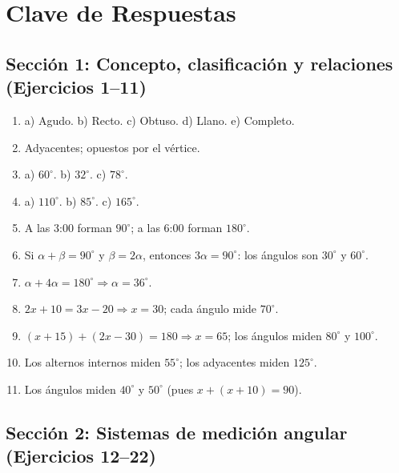 \documentclass[12pt, letterpaper]{article}
\begin{document}
  \section{Clave de Respuestas}

  \subsection*{Sección 1: Concepto, clasificación y relaciones (Ejercicios 1--11)}

  \begin{enumerate}[leftmargin=*, label=\textbf{\arabic*.}]
    \setcounter{enumi}{0}
    \item a) Agudo. \quad b) Recto. \quad c) Obtuso. \quad d) Llano. \quad e) Completo.
    \item Adyacentes; opuestos por el vértice.
    \item a) $60^{\circ}$. \quad b) $32^{\circ}$. \quad c) $78^{\circ}$.
    \item a) $110^{\circ}$. \quad b) $85^{\circ}$. \quad c) $165^{\circ}$.
    \item A las 3:00 forman $90^{\circ}$; a las 6:00 forman $180^{\circ}$.
    \item Si $\alpha + \beta = 90^{\circ}$ y $\beta = 2\alpha$, entonces $3\alpha = 90^{\circ}$: los ángulos son $30^{\circ}$ y $60^{\circ}$.
    \item $\alpha + 4\alpha = 180^{\circ} \Rightarrow \alpha = 36^{\circ}$.
    \item $2x + 10 = 3x - 20 \Rightarrow x = 30$; cada ángulo mide $70^{\circ}$.
    \item $(x+15) + (2x-30) = 180 \Rightarrow x = 65$; los ángulos miden $80^{\circ}$ y $100^{\circ}$.
    \item Los alternos internos miden $55^{\circ}$; los adyacentes miden $125^{\circ}$.
    \item Los ángulos miden $40^{\circ}$ y $50^{\circ}$ (pues $x + (x+10) = 90$).
  \end{enumerate}

  \subsection*{Sección 2: Sistemas de medición angular (Ejercicios 12--22)}
\end{document}
